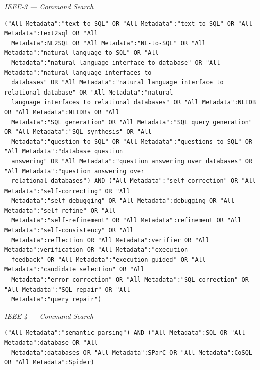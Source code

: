 \par\medskip\noindent\textit{IEEE-3 — Command Search}\par\nopagebreak
\begin{lstlisting}
("All Metadata":"text-to-SQL" OR "All Metadata":"text to SQL" OR "All Metadata":text2sql OR "All
  Metadata":NL2SQL OR "All Metadata":"NL-to-SQL" OR "All Metadata":"natural language to SQL" OR "All
  Metadata":"natural language interface to database" OR "All Metadata":"natural language interfaces to
  databases" OR "All Metadata":"natural language interface to relational database" OR "All Metadata":"natural
  language interfaces to relational databases" OR "All Metadata":NLIDB OR "All Metadata":NLIDBs OR "All
  Metadata":"SQL generation" OR "All Metadata":"SQL query generation" OR "All Metadata":"SQL synthesis" OR "All
  Metadata":"question to SQL" OR "All Metadata":"questions to SQL" OR "All Metadata":"database question
  answering" OR "All Metadata":"question answering over databases" OR "All Metadata":"question answering over
  relational databases") AND ("All Metadata":"self-correction" OR "All Metadata":"self-correcting" OR "All
  Metadata":"self-debugging" OR "All Metadata":debugging OR "All Metadata":"self-refine" OR "All
  Metadata":"self-refinement" OR "All Metadata":refinement OR "All Metadata":"self-consistency" OR "All
  Metadata":reflection OR "All Metadata":verifier OR "All Metadata":verification OR "All Metadata":"execution
  feedback" OR "All Metadata":"execution-guided" OR "All Metadata":"candidate selection" OR "All
  Metadata":"error correction" OR "All Metadata":"SQL correction" OR "All Metadata":"SQL repair" OR "All
  Metadata":"query repair")
\end{lstlisting}

\par\medskip\noindent\textit{IEEE-4 — Command Search}\par\nopagebreak
\begin{lstlisting}
("All Metadata":"semantic parsing") AND ("All Metadata":SQL OR "All Metadata":database OR "All
  Metadata":databases OR "All Metadata":SParC OR "All Metadata":CoSQL OR "All Metadata":Spider)
\end{lstlisting}

